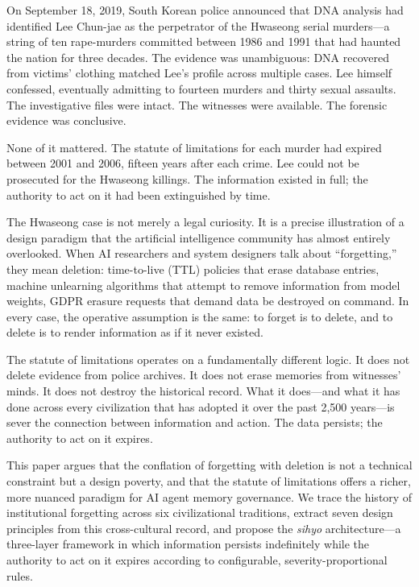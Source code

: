 \documentclass[12pt]{article}
\begin{document}
On September 18, 2019, South Korean police announced that DNA analysis had identified Lee Chun-jae as the perpetrator of the Hwaseong serial murders---a string of ten rape-murders committed between 1986 and 1991 that had haunted the nation for three decades. The evidence was unambiguous: DNA recovered from victims' clothing matched Lee's profile across multiple cases. Lee himself confessed, eventually admitting to fourteen murders and thirty sexual assaults. The investigative files were intact. The witnesses were available. The forensic evidence was conclusive.

None of it mattered. The statute of limitations for each murder had expired between 2001 and 2006, fifteen years after each crime. Lee could not be prosecuted for the Hwaseong killings. The information existed in full; the authority to act on it had been extinguished by time.

The Hwaseong case is not merely a legal curiosity. It is a precise illustration of a design paradigm that the artificial intelligence community has almost entirely overlooked. When AI researchers and system designers talk about ``forgetting,'' they mean deletion: time-to-live (TTL) policies that erase database entries, machine unlearning algorithms that attempt to remove information from model weights, GDPR erasure requests that demand data be destroyed on command. In every case, the operative assumption is the same: to forget is to delete, and to delete is to render information as if it never existed.

The statute of limitations operates on a fundamentally different logic. It does not delete evidence from police archives. It does not erase memories from witnesses' minds. It does not destroy the historical record. What it does---and what it has done across every civilization that has adopted it over the past 2,500 years---is sever the connection between information and action. The data persists; the authority to act on it expires.

This paper argues that the conflation of forgetting with deletion is not a technical constraint but a design poverty, and that the statute of limitations offers a richer, more nuanced paradigm for AI agent memory governance. We trace the history of institutional forgetting across six civilizational traditions, extract seven design principles from this cross-cultural record, and propose the \emph{sihyo} architecture---a three-layer framework in which information persists indefinitely while the authority to act on it expires according to configurable, severity-proportional rules.
\end{document}
